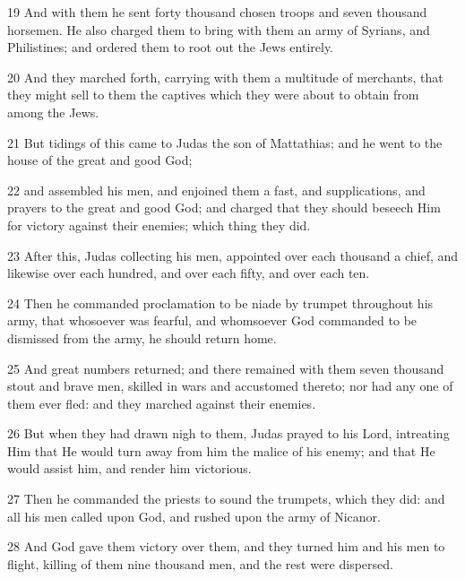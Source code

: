 \par 19 And with them he sent forty thousand chosen troops and seven thousand horsemen. He also charged them to bring with them an army of Syrians, and Philistines; and ordered them to root out the Jews entirely. 

\par 20 And they marched forth, carrying with them a multitude of merchants, that they might sell to them the captives which they were about to obtain from among the Jews. 

\par 21 But tidings of this came to Judas the son of Mattathias; and he went to the house of the great and good God; 

\par 22 and assembled his men, and enjoined them a fast, and supplications, and prayers to the great and good God; and charged that they should beseech Him for victory against their enemies; which thing they did. 

\par 23 After this, Judas collecting his men, appointed over each thousand a chief, and likewise over each hundred, and over each fifty, and over each ten. 

\par 24 Then he commanded proclamation to be niade by trumpet throughout his army, that whosoever was fearful, and whomsoever God commanded to be dismissed from the army, he should return home. 

\par 25 And great numbers returned; and there remained with them seven thousand stout and brave men, skilled in wars and accustomed thereto; nor had any one of them ever fled: and they marched against their enemies. 

\par 26 But when they had drawn nigh to them, Judas prayed to his Lord, intreating Him that He would turn away from him the malice of his enemy; and that He would assist him, and render him victorious. 

\par 27 Then he commanded the priests to sound the trumpets, which they did: and all his men called upon God, and rushed upon the army of Nicanor. 

\par 28 And God gave them victory over them, and they turned him and his men to flight, killing of them nine thousand men, and the rest were dispersed. 

